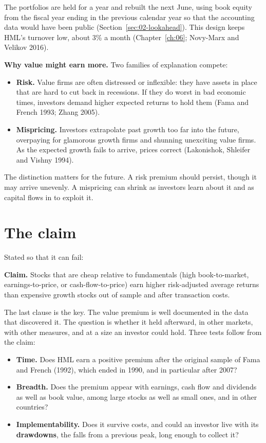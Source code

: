 The portfolios are held for a year and rebuilt the next June, using book equity from the fiscal year ending in the previous calendar year so that the accounting data would have been public (Section~\ref{sec:02-lookahead}). This design keeps HML's turnover low, about 3\% a month (Chapter~\ref{ch:06}; Novy-Marx and Velikov 2016).

\textbf{Why value might earn more.} Two families of explanation compete:

\begin{itemize}
  \item \textbf{Risk.} Value firms are often distressed or inflexible: they have assets in place that are hard to cut back in recessions. If they do worst in bad economic times, investors demand higher expected returns to hold them (Fama and French 1993; Zhang 2005).
  \item \textbf{Mispricing.} Investors extrapolate past growth too far into the future, overpaying for glamorous growth firms and shunning unexciting value firms. As the expected growth fails to arrive, prices correct (Lakonishok, Shleifer and Vishny 1994).
\end{itemize}

The distinction matters for the future. A risk premium should persist, though it may arrive unevenly. A mispricing can shrink as investors learn about it and as capital flows in to exploit it.

\section{The claim}
\label{sec:08-claim}

Stated so that it can fail:

\begin{callout}
\textbf{Claim.} Stocks that are cheap relative to fundamentals (high book-to-market, earnings-to-price, or cash-flow-to-price) earn higher risk-adjusted average returns than expensive growth stocks out of sample and after transaction costs.
\end{callout}

The last clause is the key. The value premium is well documented in the data that discovered it. The question is whether it held afterward, in other markets, with other measures, and at a size an investor could hold. Three tests follow from the claim:

\begin{itemize}
  \item \textbf{Time.} Does HML earn a positive premium after the original sample of Fama and French (1992), which ended in 1990, and in particular after 2007?
  \item \textbf{Breadth.} Does the premium appear with earnings, cash flow and dividends as well as book value, among large stocks as well as small ones, and in other countries?
  \item \textbf{Implementability.} Does it survive costs, and could an investor live with its \textbf{drawdowns}, the falls from a previous peak, long enough to collect it?
\end{itemize}

